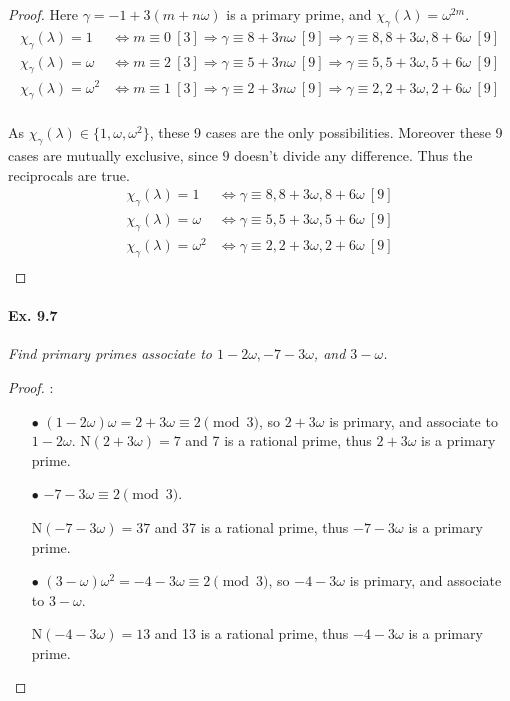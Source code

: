 \documentclass[11pt,a4paper]{article}
\newcommand{\n}{\mathrm{N}}
\begin{document}
\begin{proof}
Here $\gamma = -1 + 3(m+n\omega)$ is a primary prime, and $\chi_\gamma(\lambda) = \omega^{2m}$.
\begin{align*}
\chi_\gamma(\lambda)=1 &\iff m\equiv0\ [3] \Rightarrow \gamma \equiv 8+3n\omega\ [9]\Rightarrow \gamma\equiv8,8+3\omega,8+6\omega\ [9]\\
\chi_\gamma(\lambda)=\omega&\iff m\equiv2\ [3] \Rightarrow \gamma \equiv5+3n\omega\ [9]\Rightarrow \gamma\equiv5,5+3\omega,5+6\omega\ [9]\\
\chi_\gamma(\lambda)=\omega^2& \iff m\equiv1\ [3] \Rightarrow \gamma \equiv2+3n\omega\ [9]\Rightarrow \gamma\equiv2,2+3\omega,2+6\omega\ [9]\\
\end{align*}

As $\chi_\gamma(\lambda) \in \{1,\omega,\omega^2\}$, these 9 cases are the only possibilities. Moreover these 9 cases are mutually exclusive, since $9$ doesn't divide  any difference. Thus the reciprocals are true.
\begin{align*}
\chi_\gamma(\lambda)=1 &\iff \gamma\equiv8,8+3\omega,8+6\omega\ [9]\\
\chi_\gamma(\lambda)=\omega&\iff \gamma\equiv5,5+3\omega,5+6\omega\ [9]\\
\chi_\gamma(\lambda)=\omega^2&\iff \gamma\equiv2,2+3\omega,2+6\omega\ [9]\\
\end{align*}
\end{proof}

\paragraph{Ex. 9.7}

{\it Find primary primes associate to $1-2\omega, -7-3\omega$, and $3-\omega$.
}

\begin{proof} 
: \\
\begin{enumerate}
\item[$\bullet$] $(1-2\omega)\omega = 2 + 3 \omega \equiv 2 \pmod 3$, so $2+3\omega$ is primary, and associate to $1-2\omega$.
$\n(2+3\omega) = 7$ and 7 is a rational prime, thus $2 + 3\omega$ is a primary prime.
\item[$\bullet$] $-7 - 3 \omega \equiv 2 \pmod 3$.

$\n(-7-3\omega) = 37$ and 37 is a rational prime, thus $-7 - 3\omega$ is a primary prime.
\item[$\bullet$] $(3-\omega)\omega^2 = -4 - 3\omega \equiv 2 \pmod 3$, so $-4-3\omega$ is primary, and  associate to $3-\omega$.

$\n(-4 - 3 \omega) = 13$ and 13 is a rational prime, thus $-4 - 3 \omega$ is a primary prime.
\end{enumerate}
\end{proof}
\end{document}
